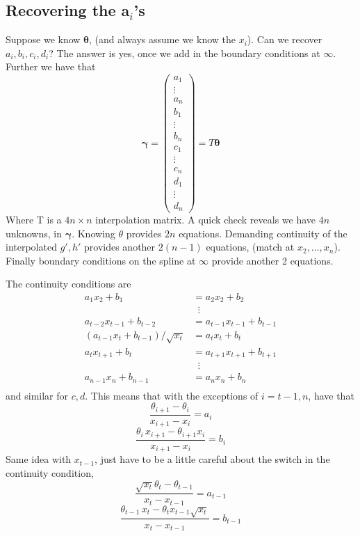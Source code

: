 \documentclass{article}
\newcommand{\bs}{\boldsymbol}                               %
\begin{document}
\subsection*{Recovering the a$_{i}$'s}
Suppose we know $\bs{\theta}$, (and always assume we know the $x_i$).
Can we recover $a_i, b_i, c_i, d_i$? 
The answer is yes, once we add in the boundary conditions at $\infty$.
Further we have that 
\[ \bs{\gamma} = \left( \begin{array}{c} a_1 \\ \vdots 
\\ a_n \\[3pt] b_1 \\ \vdots \\ b_n \\[3pt] c_1 \\ \vdots \\ c_n 
\\[3pt] d_1 \\ \vdots \\ d_n  \end{array} \right)
= T \bs{\theta} \]
Where T is a $4n \times n$ interpolation matrix. A quick check reveals
we have $4n$ unknowns, in $\bs{\gamma}$. Knowing $\theta$ provides $2n$
equations. Demanding continuity of the interpolated $g',h'$ provides
another $2(n-1)$ equations, (match at $x_2, \dots, x_n$). Finally boundary
conditions on the spline at $\infty$ provide another 2 equations.

The continuity conditions are 
\begin{align*}
a_1 x_2 + b_1 &= a_2 x_2 + b_2 \\
& \;\; \vdots \\
a_{t-2} x_{t-1} + b_{t-2} &= a_{t-1} x_{t-1} + b_{t-1} \\
(a_{t-1} x_{t} + b_{t-1})/\sqrt{x_t} &= a_{t} x_{t} + b_{t} \\
a_{t} x_{t+1} + b_{t} &= a_{t+1} x_{t+1} + b_{t+1} \\
& \;\; \vdots \\
a_{n-1} x_{n} + b_{n-1} &= a_{n} x_{n} + b_{n} \\
\end{align*}
and similar for $c,d$. This means that with the exceptions of
$i=t-1,n$, have that 
\[ \frac{\theta_{i+1}-\theta_i}{x_{i+1}-x_i} = a_i \]
\[ \frac{\theta_{i}\,x_{i+1}-\theta_{i+1}x_i}{x_{i+1}-x_i} = b_i \]
Same idea with $x_{t-1}$, just have to be a little careful about
the switch in the continuity condition,
\[ \frac{\sqrt{x_t}\theta_{t}-\theta_{t-1}}{x_t-x_{t-1}} = a_{t-1} \]
\[ \frac{\theta_{t-1}\,x_t-\theta_t x_{t-1}\sqrt{x_t}}
{x_t-x_{t-1}} = b_{t-1} \]
\end{document}
